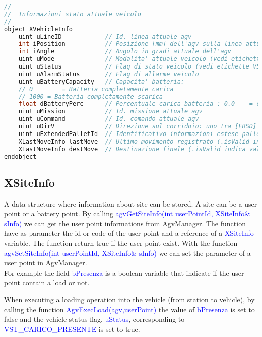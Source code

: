 \begin{lstlisting}[language=c++,caption= XVehicleInfo, label=lstXVehicleInfo]
//
//	Informazioni stato attuale veicolo
//
object XVehicleInfo
	uint uLineID            // Id. linea attuale agv
	int iPosition           // Posizione [mm] dell'agv sulla linea attuale
	int iAngle              // Angolo in gradi attuale dell'agv
	uint uMode              // Modalita' attuale veicolo (vedi etichette VM_***)
	uint uStatus            // Flag di stato veicolo (vedi etichette VST_***)
	uint uAlarmStatus       // Flag di allarme veicolo
	uint uBatteryCapacity   // Capacita' batteria:
	// 0		= Batteria completamente carica
	// 1000	= Batteria completamente scarica
	float dBatteryPerc      // Percentuale carica batteria : 0.0	= completamente scarica, 100.0 = completamente carica
	uint uMission           // Id. missione attuale agv
	uint uCommand           // Id. comando attuale agv
	uint uDirV              // Direzione sul corridoio: uno tra [FRSD]
	uint uExtendedPalletId  // Identificativo informazioni estese pallet (se presenti)
	XLastMoveInfo lastMove  // Ultimo movimento registrato (.isValid indica validita', in piu' se non valido, .uLine == 0)
	XLastMoveInfo destMove  // Destinazione finale (.isValid indica validita', in piu' se non valido, .uLine == 0)
endobject
\end{lstlisting}
%
\subsection{XSiteInfo}
A data structure where information about site can be stored. A site can be a user point or a battery point.
By calling \textcolor{blue}{agvGetSiteInfo(int userPointId, XSiteInfo\& sInfo)} we can get the user point informations from AgvManager. The function have as parameter the id or code of the user point and a reference of a \textcolor{blue}{XSiteInfo} variable.
The function return true if the user point exist.
With the function \textcolor{blue}{agvSetSiteInfo(int userPointId, XSiteInfo\& sInfo)} we can set the parameter of a user point in AgvManager.\\

For example the field \textcolor{blue}{bPresenza} is a boolean variable that indicate if the user point contain a load or not.

When executing a loading operation into the vehicle (from station to vehicle), by calling the function \textcolor{blue}{AgvExecLoad(agv,userPoint)} the value of \textcolor{blue}{bPresenza} is set to false and the vehicle status flag, \textcolor{blue}{uStatus}, corresponding to \textcolor{blue}{VST\_CARICO\_PRESENTE} is set to true.

